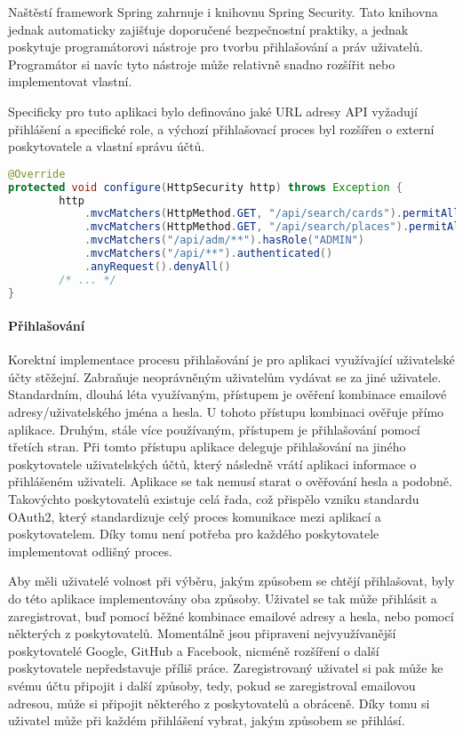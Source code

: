 			Naštěstí framework Spring zahrnuje i knihovnu Spring Security.
			Tato knihovna jednak automaticky zajišťuje doporučené bezpečnostní praktiky, a jednak poskytuje programátorovi
			nástroje pro tvorbu přihlašování a práv uživatelů.
			Programátor si navíc tyto nástroje může relativně snadno rozšířit nebo implementovat vlastní.

			Specificky pro tuto aplikaci bylo definováno jaké \ac{URL} adresy \ac{API} vyžadují přihlášení a specifické
			role, a výchozí přihlašovací proces byl rozšířen o externí poskytovatele a vlastní správu účtů.

			\begin{lstlisting}[language=Java, caption={Ukázka části nastavení zabezpečení API pomocí knihovny Spring Security. Zdroj: [autor]}]
@Override
protected void configure(HttpSecurity http) throws Exception {
        http
            .mvcMatchers(HttpMethod.GET, "/api/search/cards").permitAll()
            .mvcMatchers(HttpMethod.GET, "/api/search/places").permitAll()
            .mvcMatchers("/api/adm/**").hasRole("ADMIN")
            .mvcMatchers("/api/**").authenticated()
            .anyRequest().denyAll()
        /* ... */
}
			\end{lstlisting}

			\paragraph{Přihlašování}

			Korektní implementace procesu přihlašování je pro aplikaci využívající uživatelské účty stěžejní.
			Zabraňuje neoprávněným uživatelům vydávat se za jiné uživatele.
			Standardním, dlouhá léta využívaným, přístupem je ověření kombinace emailové adresy/uživatelského jména
			a hesla.
			U tohoto přístupu kombinaci ověřuje přímo aplikace.
			Druhým, stále více používaným, přístupem je přihlašování pomocí třetích stran.
			Při tomto přístupu aplikace deleguje přihlašování na jiného poskytovatele uživatelských účtů, který následně
			vrátí aplikaci informace o přihlášeném uživateli.
			Aplikace se tak nemusí starat o ověřování hesla a podobně.
			Takovýchto poskytovatelů existuje celá řada, což přispělo vzniku standardu OAuth2, který standardizuje celý proces
			komunikace mezi aplikací a poskytovatelem.
			Díky tomu není potřeba pro každého poskytovatele implementovat odlišný proces.

			Aby měli uživatelé volnost při výběru, jakým způsobem se chtějí přihlašovat, byly do této aplikace implementovány
			oba způsoby.
			Uživatel se tak může přihlásit a zaregistrovat, buď pomocí běžné kombinace emailové adresy a hesla, nebo pomocí
			některých z poskytovatelů.
			Momentálně jsou připraveni nejvyužívanější poskytovatelé Google, GitHub a Facebook, nicméně rozšíření o
			další poskytovatele nepředstavuje příliš práce.
			Zaregistrovaný uživatel si pak může ke svému účtu připojit i další způsoby, tedy, pokud se zaregistroval emailovou
			adresou, může si připojit některého z poskytovatelů a obráceně.
			Díky tomu si uživatel může při každém přihlášení vybrat, jakým způsobem se přihlásí.

